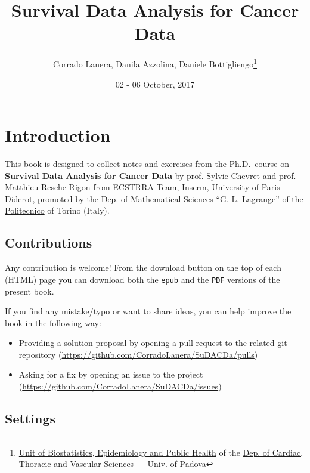 \documentclass[]{book}
\title{Survival Data Analysis for Cancer Data}
\author{Corrado Lanera, Danila Azzolina, Daniele Bottigliengo\footnote{\href{http://www.dctv.unipd.it/dipartimento/strutture/biostatistica}{Unit
  of Biostatistics, Epidemiology and Public Health} of the
  \href{http://www.dctv.unipd.it/}{Dep. of Cardiac, Thoracic and
  Vascular Sciences} --- \href{http://www.unipd.it/}{Univ. of Padova}}}
\date{02 - 06 October, 2017}
\theoremstyle{definition}
\theoremstyle{definition}
\theoremstyle{definition}
\theoremstyle{remark}
\begin{document}
\maketitle

{
\setcounter{tocdepth}{1}
\tableofcontents
}
\chapter*{Introduction}\label{introduction}

This book is designed to collect notes and exercises from the
Ph.D.~course on
\href{http://www.politocomunica.polito.it/events/appuntamenti/(idnews)/9665}{\textbf{Survival
Data Analysis for Cancer Data}} by prof. Sylvie Chevret and prof.
Matthieu Resche-Rigon from \href{http://www.cress-umr1153.fr/}{ECSTRRA
Team}, \href{https://www.inserm.fr/}{Inserm},
\href{https://www.univ-paris-diderot.fr/}{University of Paris Diderot},
promoted by the \href{http://www.disma.polito.it/}{Dep. of Mathematical
Sciences ``G. L. Lagrange''} of the
\href{http://www.polito.it/}{Politecnico} of Torino (Italy).

\section*{Contributions}\label{contributions}

Any contribution is welcome! From the download button on the top of each
(HTML) page you can download both the \texttt{epub} and the \texttt{PDF}
versions of the present book.

If you find any mistake/typo or want to share ideas, you can help
improve the book in the following way:

\begin{itemize}
\item
  Providing a solution proposal by opening a pull request to the related
  git repository (\url{https://github.com/CorradoLanera/SuDACDa/pulls})
\item
  Asking for a fix by opening an issue to the project
  (\url{https://github.com/CorradoLanera/SuDACDa/issues})
\end{itemize}

\section*{Settings}\label{settings}
\end{document}
